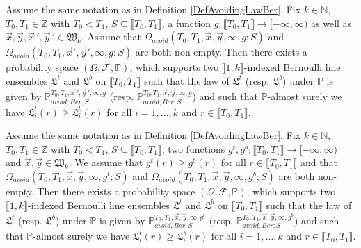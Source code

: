 \begin{lemma}\label{MCLxy} Assume the same notation as in Definition \ref{DefAvoidingLawBer}. Fix $k \in \mathbb{N}$, $T_0, T_1 \in \mathbb{Z}$ with $T_0 < T_1$, $S\subseteq\llbracket T_0,T_1\rrbracket$, a function $g: \llbracket T_0, T_1 \rrbracket  \rightarrow [-\infty, \infty)$ as well as $\vec{x}, \vec{y}, \vec{x}\,', \vec{y}\,' \in \mathfrak{W}_k$. Assume that $\Omega_{avoid}(T_0, T_1, \vec{x}, \vec{y}, \infty,g; S)$ and $\Omega_{avoid}(T_0, T_1, \vec{x}', \vec{y}', \infty,g; S)$ are both non-empty. Then there exists a probability space $(\Omega, \mathcal{F}, \mathbb{P})$, which supports two $\llbracket 1, k \rrbracket$-indexed Bernoulli line ensembles $\mathfrak{L}^t$ and $\mathfrak{L}^b$ on $\llbracket T_0, T_1 \rrbracket$ such that the law of $\mathfrak{L}^{t}$ {\big (}resp. $\mathfrak{L}^b${\big )} under $\mathbb{P}$ is given by $\mathbb{P}_{avoid, Ber; S}^{T_0, T_1, \vec{x}\,', \vec{y}\,', \infty, g}$ {\big (}resp. $\mathbb{P}_{avoid, Ber; S}^{T_0, T_1, \vec{x}, \vec{y}, \infty, g}${\big )} and such that $\mathbb{P}$-almost surely we have $\mathfrak{L}_i^t(r) \geq \mathfrak{L}^b_i(r)$ for all $i = 1,\dots, k$ and $r \in \llbracket T_0, T_1 \rrbracket$.
\end{lemma}

\begin{lemma}\label{MCLfg} Assume the same notation as in Definition \ref{DefAvoidingLawBer}. Fix $k \in \mathbb{N}$,  $T_0, T_1 \in \mathbb{Z}$ with $T_0 < T_1$, $S\subseteq\llbracket T_0, T_1\rrbracket$, two functions $g^t, g^b: \llbracket T_0, T_1 \rrbracket \rightarrow [-\infty,\infty)$ and $\vec{x}, \vec{y} \in \mathfrak{W}_k$. We assume that $g^t(r) \geq g^b(r)$ for all $r \in \llbracket T_0, T_1 \rrbracket$ and that $\Omega_{avoid}(T_0, T_1, \vec{x}, \vec{y}, \infty,g^t; S)$ and $\Omega_{avoid}(T_0, T_1, \vec{x}, \vec{y}, \infty,g^b; S)$ are both non-empty. Then there exists a probability space $(\Omega, \mathcal{F}, \mathbb{P})$, which supports two $\llbracket 1, k \rrbracket$-indexed Bernoulli line ensembles $\mathfrak{L}^t$ and $\mathfrak{L}^b$ on $\llbracket T_0, T_1 \rrbracket$ such that the law of $\mathfrak{L}^{t}$ {\big (}resp. $\mathfrak{L}^b${\big )} under $\mathbb{P}$ is given by $\mathbb{P}_{avoid, Ber; S}^{T_0, T_1, \vec{x}, \vec{y}, \infty, g^t}$ {\big (}resp. $\mathbb{P}_{avoid, Ber; S}^{T_0,T_1, \vec{x}, \vec{y}, \infty, g^b}${\big )} and such that $\mathbb{P}$-almost surely we have $\mathfrak{L}_i^t(r) \geq \mathfrak{L}^b_i(r)$ for all $i = 1,\dots, k$ and $r \in \llbracket T_0, T_1 \rrbracket$.
\end{lemma}

